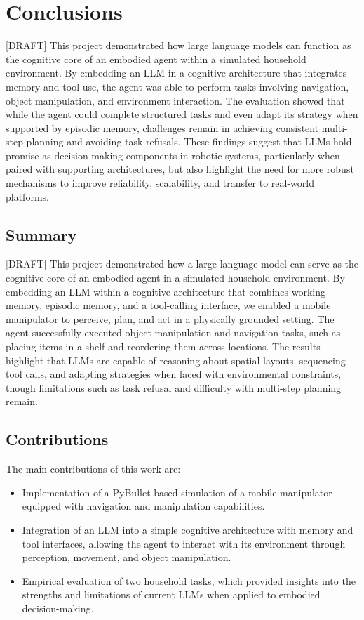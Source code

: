\documentclass[../report.tex]{subfiles}
\begin{document}
\section{Conclusions}
\label{sec:conclusions}
[DRAFT]
This project demonstrated how large language models can function as the cognitive core of an embodied agent within a simulated household environment. By embedding an LLM in a cognitive architecture that integrates memory and tool-use, the agent was able to perform tasks involving navigation, object manipulation, and environment interaction. The evaluation showed that while the agent could complete structured tasks and even adapt its strategy when supported by episodic memory, challenges remain in achieving consistent multi-step planning and avoiding task refusals. These findings suggest that LLMs hold promise as decision-making components in robotic systems, particularly when paired with supporting architectures, but also highlight the need for more robust mechanisms to improve reliability, scalability, and transfer to real-world platforms.

\subsection{Summary}
\label{sec:conclusions:summary}
[DRAFT]
This project demonstrated how a large language model can serve as the cognitive core of an embodied agent in a simulated household environment. By embedding an LLM within a cognitive architecture that combines working memory, episodic memory, and a tool-calling interface, we enabled a mobile manipulator to perceive, plan, and act in a physically grounded setting. The agent successfully executed object manipulation and navigation tasks, such as placing items in a shelf and reordering them across locations. The results highlight that LLMs are capable of reasoning about spatial layouts, sequencing tool calls, and adapting strategies when faced with environmental constraints, though limitations such as task refusal and difficulty with multi-step planning remain.

\subsection{Contributions}
\label{sec:conclusions:contributions}
The main contributions of this work are:
\begin{itemize}
	\item Implementation of a PyBullet-based simulation of a mobile manipulator equipped with navigation and manipulation capabilities.
	\item Integration of an LLM into a simple cognitive architecture with memory and tool interfaces, allowing the agent to interact with its environment through perception, movement, and object manipulation.
	\item Empirical evaluation of two household tasks, which provided insights into the strengths and limitations of current LLMs when applied to embodied decision-making.
\end{itemize}
\end{document}
